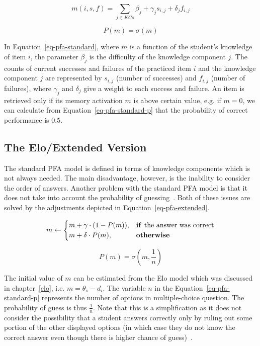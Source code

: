 \begin{equation} \label{eq-pfa-standard}
  m(i,s,f) = \sum_{j \in KCs} \beta_j + \gamma_j s_{i,j} + \delta_j f_{i,j} 
\end{equation}

\begin{equation} \label{eq-pfa-standard-p}
  P(m) = \sigma(m)
\end{equation}

In Equation~\ref{eq-pfa-standard}, where $m$ is a function of the student's knowledge of item $i$, the parameter $\beta_j$ is the difficulty of the knowledge component $j$. The counts of current successes and failures of the practiced item $i$ and the knowledge component $j$ are represented by $s_{i,j}$ (number of successes) and $f_{i,j}$ (number of failures), where $\gamma_j$ and $\delta_j$ give a weight to each success and failure. An item is retrieved only if its memory activation $m$ is above certain value, e.g. if $m = 0$, we can calculate from Equation~\ref{eq-pfa-standard-p} that the probability of correct performance is $0.5$.

\subsection*{The Elo/Extended Version}
\label{pfae}

The standard PFA model is defined in terms of knowledge components which is not always needed. The main disadvantage, however, is the inability to consider the order of answers. Another problem with the standard PFA model is that it does not take into account the probability of guessing~\cite{Papousek2014}. Both of these issues are solved by the adjustments depicted in Equation~\ref{eq-pfa-extended}.

\begin{equation} \label{eq-pfa-extended}
  m \gets \begin{cases}
            m + \gamma \cdot (1 - P(m)), & \text{\textbf{if }} \text{the answer was correct} \\
            m + \delta \cdot P(m), & \text{\textbf{otherwise}}
          \end{cases}
\end{equation}

\begin{equation} \label{eq-pfa-standard-p}
  P(m) = \sigma\left(m,\frac{1}{n}\right)
\end{equation}

The initial value of $m$ can be estimated from the Elo model which was discussed in chapter~\ref{elo}, i.e. $m = \theta_s - d_i$. The variable $n$ in the Equation~\ref{eq-pfa-standard-p} represents the number of options in multiple-choice question. The probability of guess is thus $\frac{1}{n}$. Note that this is a simplification as it does not consider the possibility that a student answers correctly only by ruling out some portion of the other displayed options (in which case they do not know the correct answer even though there is higher chance of guess)~\cite{Pelanek2015a}.

